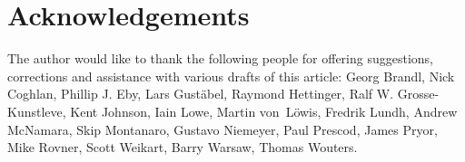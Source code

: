 \documentclass{howto}
\begin{document}
\section{Acknowledgements \label{acks}}

The author would like to thank the following people for offering
suggestions, corrections and assistance with various drafts of this
article: Georg Brandl, Nick Coghlan, Phillip J. Eby, Lars Gust\"abel,
Raymond Hettinger, Ralf W. Grosse-Kunstleve, Kent Johnson, Iain Lowe,
Martin von~L\"owis, Fredrik Lundh, Andrew McNamara, Skip Montanaro,
Gustavo Niemeyer, Paul Prescod, James Pryor, Mike Rovner, Scott
Weikart, Barry Warsaw, Thomas Wouters.
\end{document}
